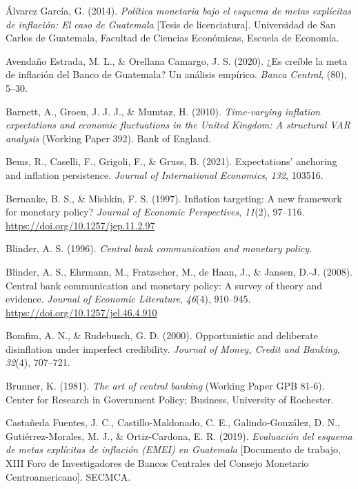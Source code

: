 \documentclass[
  10.5pt,
  letterpaper,
  twocolumn]{article}
\newlength{\cslhangindent}
\newenvironment{CSLReferences}[2] %
 {\begin{list}{}{%
  \setlength{\itemindent}{0pt}
  \setlength{\leftmargin}{0pt}
  \setlength{\parsep}{0pt}
  \ifodd #1
   \setlength{\leftmargin}{\cslhangindent}
   \setlength{\itemindent}{-1\cslhangindent}
  \fi
  \setlength{\itemsep}{#2\baselineskip}}}
 {\end{list}}
\begin{document}
\label{refs}
\begin{CSLReferences}{1}{0}
Álvarez García, G. (2014). \emph{Política monetaria bajo el esquema de
metas explícitas de inflación: El caso de {Guatemala}} {[}Tesis de
licenciatura{]}. Universidad de San Carlos de Guatemala, Facultad de
Ciencias Económicas, Escuela de Economía.

Avendaño Estrada, M. L., \& Orellana Camargo, J. S. (2020). ¿Es creíble
la meta de inflación del {Banco de Guatemala}? Un análisis empírico.
\emph{Banca Central}, (80), 5--30.

Barnett, A., Groen, J. J. J., \& Mumtaz, H. (2010). \emph{Time-varying
inflation expectations and economic fluctuations in the {United
Kingdom}: A structural {VAR} analysis} (Working Paper 392). Bank of
England.

Bems, R., Caselli, F., Grigoli, F., \& Gruss, B. (2021). Expectations'
anchoring and inflation persistence. \emph{Journal of International
Economics}, \emph{132}, 103516.

Bernanke, B. S., \& Mishkin, F. S. (1997). Inflation targeting: A new
framework for monetary policy? \emph{Journal of Economic Perspectives},
\emph{11}(2), 97--116. \url{https://doi.org/10.1257/jep.11.2.97}

Blinder, A. S. (1996). \emph{Central bank communication and monetary
policy}.

Blinder, A. S., Ehrmann, M., Fratzscher, M., de Haan, J., \& Jansen,
D.-J. (2008). Central bank communication and monetary policy: A survey
of theory and evidence. \emph{Journal of Economic Literature},
\emph{46}(4), 910--945. \url{https://doi.org/10.1257/jel.46.4.910}

Bomfim, A. N., \& Rudebusch, G. D. (2000). Opportunistic and deliberate
disinflation under imperfect credibility. \emph{Journal of Money, Credit
and Banking}, \emph{32}(4), 707--721.

Brunner, K. (1981). \emph{The art of central banking} (Working Paper GPB
81-6). Center for Research in Government Policy; Business, University of
Rochester.

Castañeda Fuentes, J. C., Castillo-Maldonado, C. E., Galindo-González,
D. N., Gutiérrez-Morales, M. J., \& Ortiz-Cardona, E. R. (2019).
\emph{Evaluación del esquema de metas explícitas de inflación ({EMEI})
en {Guatemala}} {[}Documento de trabajo, XIII Foro de Investigadores de
Bancos Centrales del Consejo Monetario Centroamericano{]}. SECMCA.


\end{CSLReferences}
\end{document}
